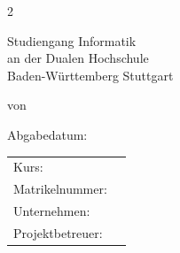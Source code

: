 \documentclass[12pt]{report}
\begin{document}
 
	
	\begin{titlepage}
		\thispagestyle{titlepage}
		\newcommand\HRule{\rule{\textwidth}{1pt}} %

		
		\begin{center}
			
			\vspace*{2cm}
			
			\begin{spacing}{2}
				{ \huge \bfseries \MakeUppercase{\meinTitel}}
			\end{spacing}
			
			\vspace*{1.5cm}
			
			\Large \artDerArbeit
			
			\vspace*{3cm}
			
			{\LARGE Studiengang Informatik}\\
			{\LARGE an der Dualen Hochschule}\\
			{\LARGE Baden-Württemberg Stuttgart}\\

			\vspace*{2.5cm}
			
			\Large von \meinName
			
			\vspace*{1.5cm}
			
			\Large Abgabedatum: \abgabeDatum
			

			\begin{table}[bp]
				\centering
				\begin{tabular}{l l}
					Kurs: & \meinKurs\\
					Matrikelnummer: & \meineMatrikelNr\\
					Unternehmen: & \firmenName\\
					Projektbetreuer: &  \projektBetreuer
				\end{tabular}
			\end{table}
			
			
		\end{center}
		
	\end{titlepage}



\fancypagestyle{plain}{
	\fancyfoot[L]{\meinName\\
		 \meinKurs}
	\fancyfoot[C]{Seite \thepage\ }%
	\fancyfoot[R]{\abgabeDatum}
}
\end{document}
